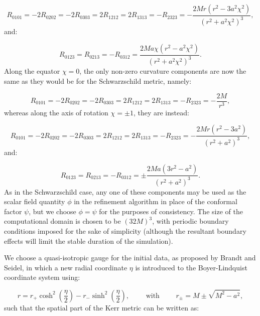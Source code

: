 \documentclass{article}
\begin{document}
\begin{equation}
R_{0 1 0 1} = -2 R_{0 2 0 2} = -2 R_{0 3 0 3} = 2 R_{1 2 1 2} = 2 R_{1 3 1 3} = - R_{2 3 2 3} = - \frac{2 M r \left( r^2 - 3 a^2 \chi^2 \right)}{\left( r^2 + a^2 \chi^2 \right)^3},
\end{equation}
and:

\begin{equation}
R_{0 1 2 3} = R_{0 2 1 3} = - R_{0 3 1 2} = \frac{2 M a \chi \left( r^2 - a^2 \chi^2 \right)}{\left( r^2 + a^2 \chi^2 \right)^3}.
\end{equation}
Along the equator ${\chi = 0}$, the only non-zero curvature components are now the same as they would be for the Schwarzschild metric, namely:

\begin{equation}
R_{0 1 0 1} = -2 R_{0 2 0 2} = -2 R_{0 3 0 3} = 2 R_{1 2 1 2} = 2 R_{1 3 1 3} = - R_{2 3 2 3} = - \frac{2M}{r^3},
\end{equation}
whereas along the axis of rotation ${\chi = \pm 1}$, they are instead:

\begin{equation}
R_{0 1 0 1} = - 2 R_{0 2 0 2} = - 2 R_{0 3 0 3} = 2 R_{1 2 1 2} = 2 R_{1 3 1 3} = - R_{2 3 2 3} = - \frac{2 M r \left( r^2 - 3 a^2 \right)}{\left( r^2 + a^2 \right)^3},
\end{equation}
and:

\begin{equation}
R_{0 1 2 3} = R_{0 2 1 3} = - R_{0 3 1 2} = \pm \frac{2 M a \left( 3 r^2 - a^2 \right)}{\left( r^2 + a^2 \right)^3}.
\end{equation}
As in the Schwarzschild case, any one of these components may be used as the scalar field quantity ${\phi}$ in the refinement algorithm in place of the conformal factor ${\psi}$, but we choose ${\phi = \psi}$ for the purposes of consistency. The size of the computational domain is chosen to be ${\left( 32 M \right)^3}$, with periodic boundary conditions imposed for the sake of simplicity (although the resultant boundary effects will limit the stable duration of the simulation).

We choose a quasi-isotropic gauge for the initial data, as proposed by Brandt and Seidel\cite{brandt2}\cite{brandt3}\cite{brandt4}, in which a new radial coordinate ${\eta}$ is introduced to the Boyer-Lindquist coordinate system\cite{dain} using:

\begin{equation}
r = r_{+} \cosh^2 \left( \frac{\eta}{2} \right) - r_{-} \sinh^2 \left( \frac{\eta}{2} \right), \qquad \text{ with } \qquad r_{\pm} = M \pm \sqrt{M^2 - a^2},
\end{equation}
such that the spatial part of the Kerr metric can be written as:
\end{document}
